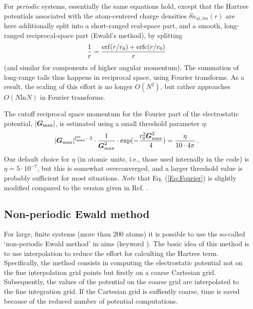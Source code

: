 For \emph{periodic} systems, essentially the same equations hold,
except that the Hartree potentials associated with the atom-centered 
charge densities $\delta\tilde{n}_{\text{at},lm}(r)$ are here
additionally split into a short-ranged real-space part, and a smooth,
long-ranged reciprocal-space part (Ewald's method), by splitting
\begin{equation}\label{Eq:Ewald}
  \frac{1}{r} = \frac{\mathop{\mathrm{erf}}(r/r_0)+\mathop{\mathrm{erfc}}(r/r_0)}{r} 
\end{equation}
(and similar for components of higher angular momentum).
The summation of long-range tails thus happens in reciprocal space,
using Fourier transforms. As a result, the scaling of this effort is
no longer $O(N^2)$, but rather approaches $O(N \mathrm{ln} N)$ in
Fourier transforms.

The cutoff reciprocal space momentum for the Fourier part of the
electrostatic potential, $|\mbox{\boldmath$G$}_\text{max}|$, is estimated using a
small threshold parameter $\eta$:
\begin{equation}\label{Eq:Fourier}
  |\mbox{\boldmath$G$}_\text{max}|^{l_\text{max}^\text{es}-2} \cdot
  \frac{1}{\mbox{\boldmath$G$}_\text{max}^2} \cdot \exp(-\frac{r_0^2
  \mbox{\boldmath$G$}_\text{max}^2}{4}) = \frac{\eta}{10\cdot 4\pi} \, .
\end{equation}
Our default choice for $\eta$ (in atomic units, i.e., those used internally in
the code) is $\eta=5\cdot 10^{-7}$, but this is somewhat overconverged, and a
larger threshold value is probably sufficient for most situations. \emph{Note}
that Eq. (\ref{Eq:Fourier}) is slightly modified compared to the version given
in Ref. \cite{Blum08}.



\subsection{Non-periodic Ewald method}
\label{Sec:Hartree-non-periodic-ewald}

For large, finite systems (more than 200 atoms) it is possible to use the
so-called `non-periodic Ewald method' in aims (keyword
). The basic idea of this method is
to use interpolation to reduce the effort for calculting the Hartree term.
Specifically, the method consists in computing the electrostatic potential not
on the fine interpolation grid points but firstly on a coarse Cartesian grid.
Subsequently, the values of the potential on the coarse grid are interpolated to
the fine integration grid. If the Cartesian grid is suffiently coarse, time is
saved because of the reduced number of potential computations.

